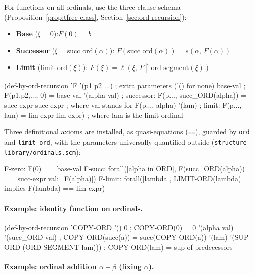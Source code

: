 For functions on all ordinals, use the three-clause schema
(Proposition~\ref{prop:tfrec-class}, Section~\ref{sec:ord-recursion}):
\begin{itemize}
\item \textbf{Base} ($\xi = 0$):\quad $F(0) = b$
\item \textbf{Successor} ($\xi = \mathrm{succ\_ord}(\alpha)$):\quad
      $F(\mathrm{succ\_ord}(\alpha)) = s(\alpha,\, F(\alpha))$
\item \textbf{Limit} ($\mathrm{limit\text{-}ord}(\xi)$):\quad
      $F(\xi) = \ell\!\left(\xi,\, F\!\restriction\!\mathrm{ord\text{-}segment}(\xi)\right)$
\end{itemize}

\begin{VNBcode}
(def-by-ord-recursion 'F
  '(p1 p2 ...)        ; extra parameters ('() for none)
  base-val            ; F(p1,p2,..., 0) = base-val
  '(alpha val)        ; successor: F(p..., succ_ORD(alpha)) = succ-expr
  succ-expr           ;   where val stands for F(p..., alpha)
  '(lam)              ; limit: F(p..., lam) = lim-expr
  lim-expr)           ;   where lam is the limit ordinal
\end{VNBcode}

Three definitional axioms are installed, as quasi-equations (\texttt{==}),
guarded by \texttt{ord} and \texttt{limit-ord}, with the parameters
universally quantified outside (\texttt{structure-library/ordinals.scm}):
\begin{VNBsnip}
F-zero:  F(0) == base-val
F-succ:  forall([alpha in ORD],
           F(succ_ORD(alpha)) == succ-expr[val:=F(alpha)])
F-limit: forall([lambda], LIMIT-ORD(lambda) implies F(lambda) == lim-expr)
\end{VNBsnip}

\paragraph{Example: identity function on ordinals.}
\begin{VNBcode}
(def-by-ord-recursion 'COPY-ORD '()
  0                                         ; COPY-ORD(0) = 0
  '(alpha val) '(succ_ORD val)              ; COPY-ORD(succ(a)) = succ(COPY-ORD(a))
  '(lam) '(SUP-ORD (ORD-SEGMENT lam)))      ; COPY-ORD(lam) = sup of predecessors
\end{VNBcode}

\paragraph{Example: ordinal addition $\alpha + \beta$ (fixing $\alpha$).}

